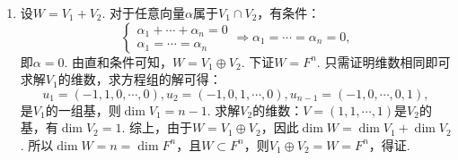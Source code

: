 \begin{enumerate}
    \item 设$W=V_1+V_2$. 对于任意向量$\alpha$属于$V_1\cap V_2$，有条件：
	\[\begin{cases}\alpha_1+\cdots +\alpha_n=0\\
	\alpha_1= \cdots  =\alpha_n \end{cases}\Rightarrow \alpha_1= \cdots  =\alpha_n =0,\]
	即$\alpha=0$. 由直和条件可知，$W=V_1\oplus V_2$. 下证$W=F^n$. 只需证明维数相同即可求解$V_1$的维数，求方程组的解可得：
	\[u_1=(-1,1,0,\cdots ,0),u_2=(-1,0,1,\cdots,0),u_{n-1}=(-1,0,\cdots ,0,1),\]
	是$V_1$的一组基，则$\dim V_1=n-1$. 求解$V_2$的维数：$V= (1,1,\cdots ,1)$是$V_2$的基，有$\dim V_2=1$. 综上，由于$W=V_1\oplus V_2$，因此$\dim W=\dim V_1+\dim V_2$. 所以$\dim W=n=\dim F^n$，且$W\subset F^n$，则$V_1\oplus V_2=W=F^n$，得证.
\end{enumerate}


